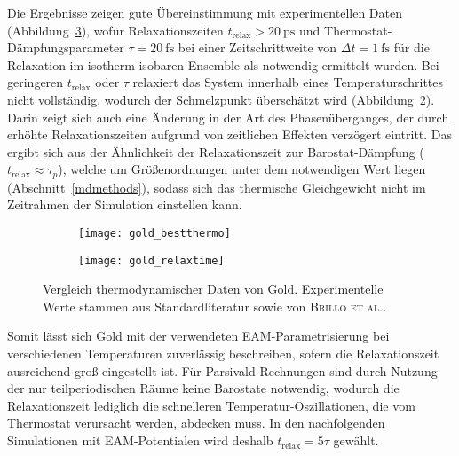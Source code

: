 Die Ergebnisse zeigen gute Übereinstimmung mit experimentellen Daten (Abbildung~\ref{fig:goldthermo}), wofür Relaxationszeiten $t_\text{relax} > \SI{20}{\pico\second}$ und Thermostat-Dämpfungsparameter $\tau = \SI{20}{\femto\second}$ bei einer Zeitschrittweite von $\Delta t = \SI{1}{\femto\second}$ für die Relaxation im isotherm-isobaren Ensemble als notwendig ermittelt wurden.
Bei geringeren $t_\text{relax}$ oder $\tau$ relaxiert das System innerhalb eines Temperaturschrittes nicht vollständig, wodurch der Schmelzpunkt überschätzt wird (Abbildung~\ref{fig:goldthermo-b}).
Darin zeigt sich auch eine Änderung in der Art des Phasenüberganges, der durch erhöhte Relaxationszeiten aufgrund von zeitlichen Effekten verzögert eintritt.
Das ergibt sich aus der Ähnlichkeit der Relaxationszeit zur Barostat-Dämpfung ($t_\text{relax}\approx \tau_p$), welche um Größenordnungen unter dem notwendigen Wert liegen (Abschnitt~\ref{mdmethods}), sodass sich das thermische Gleichgewicht nicht im Zeitrahmen der Simulation einstellen kann.

\begin{figure}[tbh]
  \captionsetup[subfigure]{singlelinecheck=false}
  \def\subfigwidth{7cm}
  \begin{subfigure}[t]{\subfigwidth}
    \texttt{[image: gold\_bestthermo]}
    \label{fig:goldthermo-a}
  \end{subfigure}
  \hfill
  \begin{subfigure}[t]{\subfigwidth}
    \texttt{[image: gold\_relaxtime]}
    \label{fig:goldthermo-b}
  \end{subfigure}
  \caption[Vergleich thermodynamischer Daten von Gold]{
    Vergleich thermodynamischer Daten von Gold.
    Experimentelle Werte stammen aus Standardliteratur sowie von \textsc{Brillo et al.}\cite{brillo_density_2006}.
  }
  \label{fig:goldthermo}
\end{figure}

Somit lässt sich Gold mit der verwendeten EAM-Parametrisierung bei verschiedenen Temperaturen zuverlässig beschreiben, sofern die Relaxationszeit ausreichend groß eingestellt ist.
Für Parsivald-Rechnungen sind durch Nutzung der nur teilperiodischen Räume keine Barostate notwendig, wodurch die Relaxationszeit lediglich die schnelleren Temperatur-Oszillationen, die vom Thermostat verursacht werden, abdecken muss.
In den nachfolgenden Simulationen mit EAM-Potentialen wird deshalb $t_\text{relax} = 5 \tau$ gewählt.

